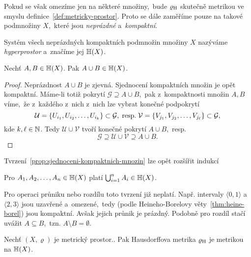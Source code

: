 Pokud se však omezíme jen na některé množiny,~bude $\varrho_\textup{H}$ skutečně metrikou ve smyslu definice~\ref{def:metricky-prostor}. Proto se dále zaměříme pouze na takové podmnožiny $X$,~které jsou \emph{neprázdné} a~\emph{kompaktní}.
\begin{definition}[Hyperprostor]\label{def:hyperprostor}
    Systém všech neprázdných kompaktních podmnožin množiny $X$ nazýváme \emph{hyperprostor} a~značíme jej $\mathbb{H}(X)$.
\end{definition}
\begin{proposition}\label{prop:sjednoceni-kompaktnich-mnozin}
    Nechť $A,B\in\mathbb{H}(X)$. Pak $A\cup B\in\mathbb{H}(X)$.
\end{proposition}
\begin{proof}
    Neprázdnost $A\cup B$ je zjevná. Sjednocení kompaktních množin je opět kompaktní. Máme-li totiž pokrytí $\mathcal{G}\supseteq A\cup B$,~pak z~kompaktnosti množin $A,B$ víme,~že z~každého z~nich z~nich lze vybrat konečné podpokrytí
    \[\mathcal{U}=\left\{U_{i_1},U_{i_2},\ldots,U_{i_k}\right\}\subset\mathcal{G},\;\text{resp.}\;\mathcal{V}=\left\{V_{j_1},V_{j_2},\ldots,V_{j_\ell}\right\}\subset\mathcal{G},\]
    kde $k,\ell\in\mathbb{N}$. Tedy $\mathcal{U}\cup\mathcal{V}$ tvoří konečné pokrytí $A\cup B$,~resp.
    \[\mathcal{G}\supseteq\mathcal{U}\cup\mathcal{V}\supseteq A\cup B.\]
\end{proof}
Tvrzení~\ref{prop:sjednoceni-kompaktnich-mnozin} lze opět rozšířit indukcí
\begin{corollary}\label{cor:sjednoceni-n-kompaktnich-mnozin}
    Pro $A_1,A_2,\ldots,A_n\in\mathbb{H}(X)$ platí $\bigcup_{i=1}^n A_i\in\mathbb{H}(X)$.
\end{corollary}
Pro operaci průniku nebo rozdílu toto tvrzení již neplatí. Např. intervaly $\langle0,1\rangle$ a~$\langle2,3\rangle$ jsou uzavřené a~omezené,~tedy (podle Heineho-Borelovy věty~\ref{thm:heine-borel}) jsou kompaktní. Avšak jejich průnik je prázdný. Podobně pro rozdíl stačí uvážit $A\subseteq B$,~tzn. $A\setminus B=\emptyset$.
\begin{theorem}\label{thm:hausdorffova-metrika-je-metrika}
    Nechť $(X,\varrho)$ je metrický prostor.. Pak Hausdorffova metrika $\varrho_\textup{H}$ je metrikou na $\mathbb{H}(X)$.
\end{theorem}
